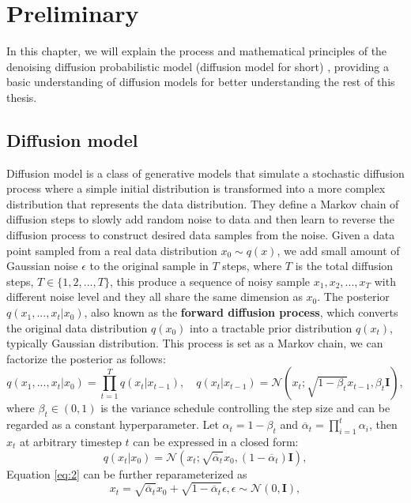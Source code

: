 \chapter{Preliminary}
\label{chapter:preliminary}
In this chapter, we will explain the process and mathematical principles of the denoising diffusion probabilistic model (diffusion model for short) \cite{ho2020denoising}, providing a basic understanding of diffusion models for better understanding the rest of this thesis.
\section{Diffusion model}
\label{sec:ddpm}
Diffusion model is a class of generative models that simulate a stochastic diffusion process where a simple initial distribution is transformed into a more complex distribution that represents the data distribution. They define a Markov chain of diffusion steps to slowly add random noise to data and then learn to reverse the diffusion process to construct desired data samples from the noise. Given a data point sampled from a real data distribution $x_0 \sim q(x)$, we add small amount of Gaussian noise $\epsilon$ to the original sample in $T$ steps, where $T$ is the total diffusion steps, $T \in \{1, 2, ..., T\}$, this produce a sequence of noisy sample $x_1, x_2, ..., x_T$ with different noise level and they all share the same dimension as $x_0$. The posterior $q(x_1, ...,  x_t | x_0)$, also known as the \textbf{forward diffusion process}, which converts the original data distribution $q(x_0)$ into a tractable prior distribution $q(x_t)$, typically Gaussian distribution. This process is set as a Markov chain, we can factorize the posterior as follows:
\begin{equation} \label{eq:1}
    q(x_1, ..., x_t | x_0) = \prod_{t = 1}^{T} q(x_t | x_{t-1}), \quad q(x_t | x_{t-1}) = \mathcal{N}(x_t; \sqrt{1 - \beta_t}x_{t-1}, \beta_t\textbf{I}),
\end{equation}
where $\beta_t \in (0, 1)$ is the variance schedule controlling the step size and can be regarded as a constant hyperparameter. Let $\alpha_t = 1 - \beta_t$ and $\overline{\alpha}_t = \prod_{i=1}^{t}\alpha_i$, then $x_t$ at arbitrary timestep $t$ can be expressed in a closed form:
\begin{equation} \label{eq:2}
    q(x_t|x_0) = \mathcal{N}(x_t;\sqrt{\overline{\alpha}_t}x_0, (1 - \overline{\alpha}_t)\textbf{I}),
\end{equation}
Equation \ref{eq:2} can be further reparameterized as
\begin{equation} \label{eq:3}
    x_t = \sqrt{\overline{\alpha}_t}x_0 + \sqrt{1 - \overline{\alpha}_t}\epsilon, \epsilon \sim \mathcal{N}(0, \textbf{I}),
\end{equation}

